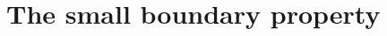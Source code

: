 \documentclass[12pt, oneside, psamsfonts]{amsart}
\theoremstyle{definition}
\newtheorem{defn}[thm]{Definition}
\theoremstyle{remark}
\newtheorem{rem}[thm]{Remark}
\numberwithin{equation}{section}
\newcommand{\norm}[1]{\| #1\|}
\newcommand{\abs}[1]{| #1 |}
\newcommand{\Comp}{\mathbb C}
\newcommand{\eps}{\varepsilon}
\newcommand{\tr}{\mathrm{T}}
\begin{document}
%
%
%




\section{The small boundary property}

%
%
\end{document}
